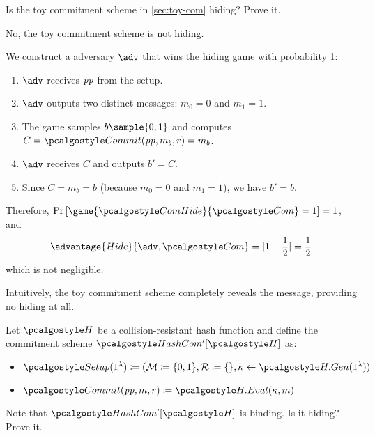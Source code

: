 \begin{exercise}
  Is the toy commitment scheme in \cref{sec:toy-com} hiding?
  Prove it.
\end{exercise}

\ifsolutions
\begin{mysolution}
  No, the toy commitment scheme is not hiding.

  We construct a \ppt adversary $\adv$ that wins the hiding game with probability 1:

  \begin{enumerate}
    \item $\adv$ receives $\mathit{pp}$ from the setup.
    \item $\adv$ outputs two distinct messages: $m_0 = 0$ and $m_1 = 1$.
    \item The game samples $b \sample \{0, 1\}$ and computes $C = \algo{Commit}(\params, m_b, r) = m_b$.
    \item $\adv$ receives $C$ and outputs $b' = C$.
    \item Since $C = m_b = b$ (because $m_0 = 0$ and $m_1 = 1$), we have $b' = b$.
  \end{enumerate}

  Therefore, $\pr{\game{\algo{ComHide}}{\algo{Com}} = 1} = 1$, and 
  \[
    \advantage{Hide}{\adv, \algo{Com}} = |1 - \frac{1}{2}| = \frac{1}{2}
  \]
  which is not negligible.

  Intuitively, the toy commitment scheme completely reveals the message, providing no hiding at all.
\end{mysolution}
\fi

\begin{exercise}
  Let $\algo{H}$ be a collision-resistant hash function and define the commitment scheme $\algo{HashCom'}[\algo{H}]$ as:
  \begin{itemize}
    \item $\algo{Setup}(1^\lambda) \defeq (\mathcal{M} \defeq \{0, 1\}, \mathcal{R} \defeq \{\}, \kappa \gets \algo{H.Gen}(1^\lambda))$
    \item $\algo{Commit}(\params, m, r) \defeq \algo{H.Eval}(\kappa, m)$
  \end{itemize}
  Note that $\algo{HashCom'}[\algo{H}]$ is binding.
  Is it hiding?
  Prove it.
\end{exercise}

